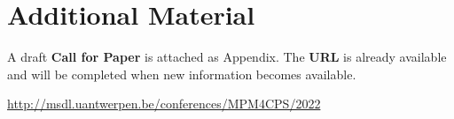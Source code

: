 \section{Additional Material}
\label{sec:Appendix}

A draft \textbf{Call for Paper} is attached as Appendix.
The \textbf{URL} is already available and will be completed when new information
becomes available.

\noindent
\url{http://msdl.uantwerpen.be/conferences/MPM4CPS/2022}

\newpage


